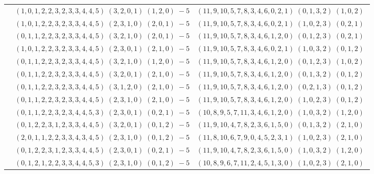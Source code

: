 \documentclass[11pt]{article}
\begin{document}
\begin{longtable}[l]{|c|c|c|}
 \cline{2-3} 
 & $(1 ,0 ,1 ,2 ,2 ,3 ,2 ,3 ,3 ,4 ,4 ,5) \;(3 ,2 ,0 ,1) \;(1 ,2 ,0) \;-5$ & $(11 ,9 ,10 ,5 ,7 ,8 ,3 ,4 ,6 ,0 ,2 ,1) \;(0 ,1 ,3 ,2) \;(1 ,0 ,2) \;$\\ 
 \cline{2-3} 
 & $(1 ,0 ,1 ,2 ,2 ,3 ,2 ,3 ,3 ,4 ,4 ,5) \;(2 ,3 ,1 ,0) \;(2 ,0 ,1) \;-5$ & $(11 ,9 ,10 ,5 ,7 ,8 ,3 ,4 ,6 ,0 ,2 ,1) \;(1 ,0 ,2 ,3) \;(0 ,2 ,1) \;$\\ 
 \cline{2-3} 
 & $(0 ,1 ,1 ,2 ,2 ,3 ,2 ,3 ,3 ,4 ,4 ,5) \;(3 ,2 ,1 ,0) \;(2 ,0 ,1) \;-5$ & $(11 ,9 ,10 ,5 ,7 ,8 ,3 ,4 ,6 ,1 ,2 ,0) \;(0 ,1 ,2 ,3) \;(0 ,2 ,1) \;$\\ 
 \cline{2-3} 
 & $(1 ,0 ,1 ,2 ,2 ,3 ,2 ,3 ,3 ,4 ,4 ,5) \;(2 ,3 ,0 ,1) \;(2 ,1 ,0) \;-5$ & $(11 ,9 ,10 ,5 ,7 ,8 ,3 ,4 ,6 ,0 ,2 ,1) \;(1 ,0 ,3 ,2) \;(0 ,1 ,2) \;$\\ 
 \cline{2-3} 
 & $(0 ,1 ,1 ,2 ,2 ,3 ,2 ,3 ,3 ,4 ,4 ,5) \;(3 ,2 ,1 ,0) \;(1 ,2 ,0) \;-5$ & $(11 ,9 ,10 ,5 ,7 ,8 ,3 ,4 ,6 ,1 ,2 ,0) \;(0 ,1 ,2 ,3) \;(1 ,0 ,2) \;$\\ 
 \cline{2-3} 
 & $(0 ,1 ,1 ,2 ,2 ,3 ,2 ,3 ,3 ,4 ,4 ,5) \;(3 ,2 ,0 ,1) \;(2 ,1 ,0) \;-5$ & $(11 ,9 ,10 ,5 ,7 ,8 ,3 ,4 ,6 ,1 ,2 ,0) \;(0 ,1 ,3 ,2) \;(0 ,1 ,2) \;$\\ 
 \cline{2-3} 
 & $(0 ,1 ,1 ,2 ,2 ,3 ,2 ,3 ,3 ,4 ,4 ,5) \;(3 ,1 ,2 ,0) \;(2 ,1 ,0) \;-5$ & $(11 ,9 ,10 ,5 ,7 ,8 ,3 ,4 ,6 ,1 ,2 ,0) \;(0 ,2 ,1 ,3) \;(0 ,1 ,2) \;$\\ 
 \cline{2-3} 
 & $(0 ,1 ,1 ,2 ,2 ,3 ,2 ,3 ,3 ,4 ,4 ,5) \;(2 ,3 ,1 ,0) \;(2 ,1 ,0) \;-5$ & $(11 ,9 ,10 ,5 ,7 ,8 ,3 ,4 ,6 ,1 ,2 ,0) \;(1 ,0 ,2 ,3) \;(0 ,1 ,2) \;$\\ 
 \cline{2-3} 
 & $(0 ,1 ,1 ,2 ,2 ,3 ,2 ,3 ,4 ,4 ,5 ,3) \;(2 ,3 ,0 ,1) \;(0 ,2 ,1) \;-5$ & $(10 ,8 ,9 ,5 ,7 ,11 ,3 ,4 ,6 ,1 ,2 ,0) \;(1 ,0 ,3 ,2) \;(1 ,2 ,0) \;$\\ 
 \cline{2-3} 
 & $(0 ,1 ,2 ,2 ,3 ,1 ,2 ,3 ,3 ,4 ,4 ,5) \;(3 ,2 ,0 ,1) \;(0 ,1 ,2) \;-5$ & $(11 ,9 ,10 ,4 ,7 ,8 ,2 ,3 ,6 ,1 ,5 ,0) \;(0 ,1 ,3 ,2) \;(2 ,1 ,0) \;$\\ 
 \cline{2-3} 
 & $(2 ,0 ,1 ,1 ,2 ,2 ,3 ,3 ,4 ,3 ,4 ,5) \;(2 ,3 ,1 ,0) \;(0 ,1 ,2) \;-5$ & $(11 ,8 ,10 ,6 ,7 ,9 ,0 ,4 ,5 ,2 ,3 ,1) \;(1 ,0 ,2 ,3) \;(2 ,1 ,0) \;$\\ 
 \cline{2-3} 
 & $(0 ,1 ,2 ,2 ,3 ,1 ,2 ,3 ,3 ,4 ,4 ,5) \;(2 ,3 ,0 ,1) \;(0 ,2 ,1) \;-5$ & $(11 ,9 ,10 ,4 ,7 ,8 ,2 ,3 ,6 ,1 ,5 ,0) \;(1 ,0 ,3 ,2) \;(1 ,2 ,0) \;$\\ 
 \cline{2-3} 
 & $(0 ,1 ,2 ,1 ,2 ,2 ,3 ,3 ,4 ,4 ,5 ,3) \;(2 ,3 ,1 ,0) \;(0 ,1 ,2) \;-5$ & $(10 ,8 ,9 ,6 ,7 ,11 ,2 ,4 ,5 ,1 ,3 ,0) \;(1 ,0 ,2 ,3) \;(2 ,1 ,0) \;$\\ 

\end{longtable}
\end{document}
